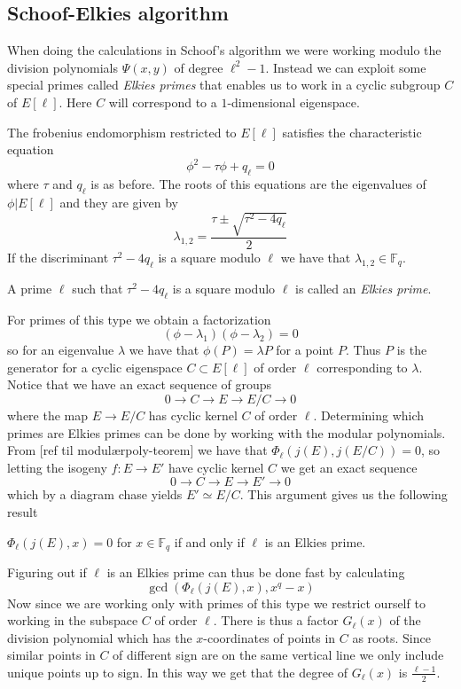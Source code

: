 \subsection{Schoof-Elkies algorithm}
When doing the calculations in Schoof's algorithm we were working modulo the division
polynomials $\Psi(x,y)$ of degree $\ell^2-1$. Instead we can exploit some special primes
called \emph{Elkies primes} that enables us to work in a cyclic subgroup $C$ of $E[\ell]$.
Here $C$ will correspond to a $1$-dimensional eigenspace.

The frobenius endomorphism restricted to $E[\ell]$ satisfies the characteristic equation
$$ \phi^2 - \tau \phi + q_\ell = 0 $$
where $\tau$ and $q_\ell$ is as before. The roots of this equations are the eigenvalues
of $\phi | E[\ell]$ and they are given by
$$ \lambda_{1,2} = \frac{\tau \pm \sqrt{\tau^2 - 4 q_\ell}}{2} $$
If the discriminant $\tau^2 - 4 q_\ell$ is a square modulo $\ell$ we have that
$\lambda_{1,2} \in \mathbb{F}_q$.
\begin{mydef}
A prime $\ell$ such that $\tau^2 - 4 q_\ell$ is a square modulo $\ell$ is called
an \emph{Elkies prime}.
\end{mydef}
For primes of this type we obtain a factorization
$$ (\phi - \lambda_1)(\phi - \lambda_2) = 0 $$
so for an eigenvalue $\lambda$ we have that $\phi(P) = \lambda P$ for a point $P$. Thus
$P$ is the generator for a cyclic eigenspace $C \subset E[\ell]$ of order $\ell$
corresponding to $\lambda$.
Notice that we have an exact sequence of groups
$$ 0 \rightarrow C \rightarrow E \rightarrow E/C \rightarrow 0 $$
where the map $E \rightarrow E/C$ has cyclic kernel $C$ of order $\ell$.
Determining which primes are Elkies primes can be done by working with the
modular polynomials. From [ref til modulærpoly-teorem] we have that $\Phi_\ell(j(E),j(E/C)) = 0$,
so letting the isogeny $f: E \rightarrow E'$ have cyclic kernel $C$ we get an exact
sequence
$$ 0 \rightarrow C \rightarrow E \rightarrow E' \rightarrow 0 $$
which by a diagram chase yields $ E' \simeq E/C $. This argument gives us the following result
\begin{prop}
 $ \Phi_\ell(j(E), x) = 0$ for $x \in \mathbb{F}_q$ if and only if $\ell$ is an Elkies
prime.
\end{prop}
Figuring out if $\ell$ is an Elkies prime can thus be done fast by calculating
$$\gcd(\Phi_\ell(j(E), x), x^q - x)$$
Now since we are working only with primes of this type we restrict ourself to working
in the subspace $C$ of order $\ell$. There is thus a factor $G_\ell(x)$ of the division polynomial
which has the $x$-coordinates of points in $C$ as roots. Since
similar points in $C$ of different sign are on the same vertical line we only include
unique points up to sign. In this way we get that the degree of $G_\ell(x)$ is $\frac{\ell-1}{2}$.

